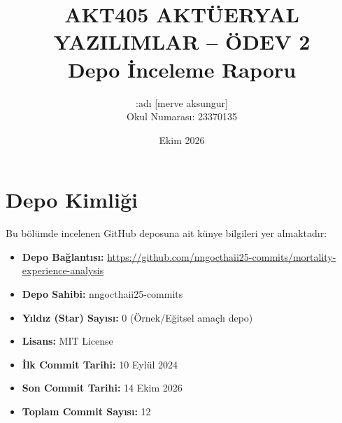 \documentclass[12pt,a4paper]{article}
\title{\textbf{AKT405 AKTÜERYAL YAZILIMLAR -- ÖDEV 2}\\ \large Depo İnceleme Raporu}
\author{:adı  [merve aksungur] \\ Okul Numarası: 23370135}
\date{Ekim 2026}
\begin{document}
\maketitle

\section{Depo Kimliği}
Bu bölümde incelenen GitHub deposuna ait künye bilgileri yer almaktadır:
\begin{itemize}
    \item \textbf{Depo Bağlantısı:} \url{https://github.com/nngocthaii25-commits/mortality-experience-analysis}
    \item \textbf{Depo Sahibi:} nngocthaii25-commits
    \item \textbf{Yıldız (Star) Sayısı:} 0 (Örnek/Eğitsel amaçlı depo)
    \item \textbf{Lisans:} MIT License
    \item \textbf{İlk Commit Tarihi:} 10 Eylül 2024
    \item \textbf{Son Commit Tarihi:} 14 Ekim 2026
    \item \textbf{Toplam Commit Sayısı:} 12
\end{itemize}
\end{document}
